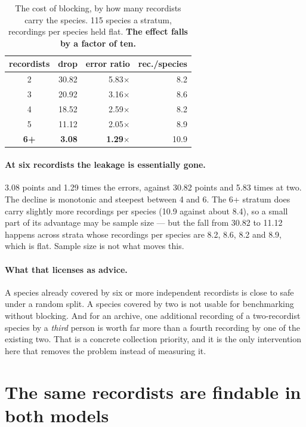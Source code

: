 \documentclass[10pt,twocolumn,a4paper]{article}
\begin{document}
\begin{table}[t]
\footnotesize
\setlength{\tabcolsep}{5pt}
\caption{The cost of blocking, by how many recordists carry the species. 115 species a stratum,
recordings per species held flat. \textbf{The effect falls by a factor of ten.}}
\label{tab:dose}
\begin{tabular}{c rr r}
\toprule
recordists & drop & error ratio & rec./species \\
\midrule
2        & 30.82 & 5.83$\times$ & 8.2 \\
3        & 20.92 & 3.16$\times$ & 8.6 \\
4        & 18.52 & 2.59$\times$ & 8.2 \\
5        & 11.12 & 2.05$\times$ & 8.9 \\
\textbf{6+} & \textbf{3.08} & \textbf{1.29$\times$} & 10.9 \\
\bottomrule
\end{tabular}
\end{table}

\paragraph{At six recordists the leakage is essentially gone.} 3.08 points and 1.29 times the
errors, against 30.82 points and 5.83 times at two. The decline is monotonic and steepest between
4 and 6. The 6+ stratum does carry slightly more recordings per species (10.9 against about 8.4),
so a small part of its advantage may be sample size --- but the fall from 30.82 to 11.12 happens
across strata whose recordings per species are 8.2, 8.6, 8.2 and 8.9, which is flat. Sample size
is not what moves this.

\paragraph{What that licenses as advice.} A species already covered by six or more independent
recordists is close to safe under a random split. A species covered by two is not usable for
benchmarking without blocking. And for an archive, one additional recording of a two-recordist
species by a \emph{third} person is worth far more than a fourth recording by one of the existing
two. That is a concrete collection priority, and it is the only intervention here that removes the
problem instead of measuring it.

\section{The same recordists are findable in both models}
\label{sec:samepeople}
\end{document}
